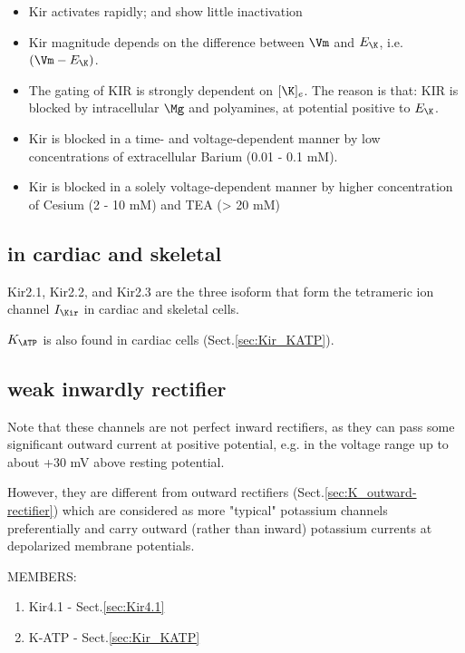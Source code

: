 \begin{itemize}
  \item Kir activates rapidly; and show little inactivation
  
  \item Kir magnitude depends on the difference between $\Vm$ and $E_\K$, i.e.
  $(\Vm - E_\K)$.

  \item The gating of KIR is strongly dependent on $[\K]_e$. The reason is that:
  KIR is blocked by intracellular $\Mg$ and polyamines, at potential positive to
  $E_\K$.
    
  \item Kir is blocked in a time- and voltage-dependent manner by low
  concentrations of extracellular Barium (0.01 - 0.1 mM).
  
  \item Kir is blocked in a solely voltage-dependent manner by higher
  concentration of Cesium (2 - 10 mM) and TEA (> 20 mM)
\end{itemize}



\subsection{in cardiac and skeletal}
\label{sec:Kir-cardiac-skeletal}

Kir2.1, Kir2.2, and Kir2.3 are the three isoform that form the tetrameric ion
channel $I_\Kir$ in cardiac and skeletal cells.

$K_\ATP$ is also found in cardiac cells (Sect.\ref{sec:Kir_KATP}).


\subsection{weak inwardly rectifier}
\label{sec:inward-rectifier-weakly}

Note that these channels are not perfect inward rectifiers, as they can pass
some significant outward current at positive potential, e.g. in the voltage
range up to about +30 mV above resting potential. 

However, they are different from outward rectifiers
(Sect.\ref{sec:K_outward-rectifier}) which are considered as more "typical"
potassium channels preferentially and carry outward (rather than inward)
potassium currents at depolarized membrane potentials.

MEMBERS:
\begin{enumerate}
  \item Kir4.1 - Sect.\ref{sec:Kir4.1}
  
  \item K-ATP - Sect.\ref{sec:Kir_KATP}
\end{enumerate}

